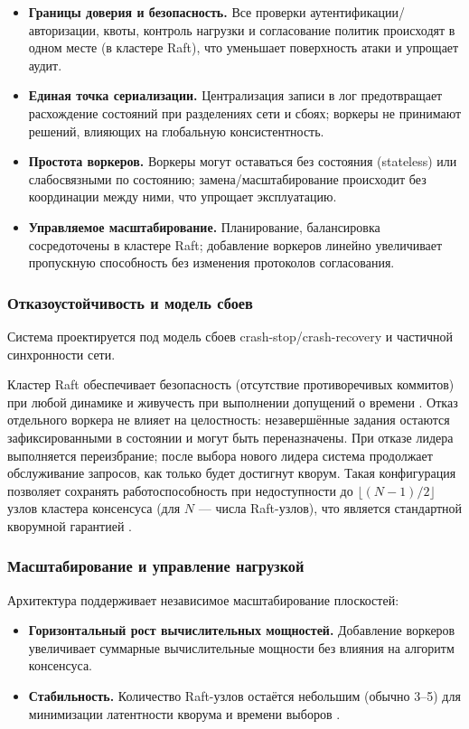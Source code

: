 \begin{itemize}
  \item \textbf{Границы доверия и безопасность.} Все проверки
  аутентификации/авторизации, квоты, контроль нагрузки и согласование политик
  происходят в одном месте (в кластере Raft), что уменьшает поверхность атаки и
  упрощает аудит.
  \item \textbf{Единая точка сериализации.} Централизация записи в лог
  предотвращает расхождение состояний при разделениях сети и сбоях; воркеры не
  принимают решений, влияющих на глобальную консистентность.
  \item \textbf{Простота воркеров.} Воркеры могут оставаться без состояния
  (stateless) или слабосвязными по состоянию; замена/масштабирование происходит
  без координации между ними, что упрощает эксплуатацию.
  \item \textbf{Управляемое масштабирование.} Планирование, балансировка
  сосредоточены в кластере Raft; добавление воркеров линейно увеличивает
  пропускную способность без изменения протоколов согласования.
\end{itemize}

\subsubsection{Отказоустойчивость и модель сбоев}

Система проектируется под модель сбоев crash-stop/crash-recovery и частичной
синхронности сети.

Кластер Raft обеспечивает безопасность (отсутствие противоречивых коммитов) при
любой динамике и живучесть при выполнении допущений о времени
\cite{ongario2014}. Отказ отдельного воркера не влияет на целостность:
незавершённые задания остаются зафиксированными в состоянии и могут быть
переназначены. При отказе лидера выполняется переизбрание; после выбора нового
лидера система продолжает обслуживание запросов, как только будет достигнут
кворум. Такая конфигурация позволяет сохранять работоспособность при
недоступности до $\lfloor (N-1)/2 \rfloor$ узлов кластера консенсуса (для $N$ —
числа Raft-узлов), что является стандартной кворумной гарантией
\cite{lynch1996}.


\subsubsection{Масштабирование и управление нагрузкой}

Архитектура поддерживает независимое масштабирование плоскостей:
\begin{itemize}
  \item \textbf{Горизонтальный рост вычислительных мощностей.} Добавление воркеров
  увеличивает суммарные вычислительные мощности без влияния на алгоритм
  консенсуса.
  \item \textbf{Стабильность.} Количество Raft-узлов остаётся небольшим (обычно
  3–5) для минимизации латентности кворума и времени выборов
  \cite{ongario2014}.
\end{itemize}

